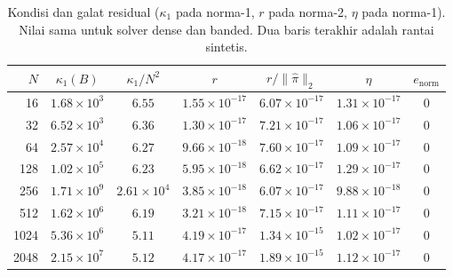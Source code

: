 \documentclass[12pt,a4paper]{article}
\numberwithin{equation}{section}
\begin{document}
\begin{table}[H]
\centering
\caption{Kondisi dan galat residual ($\kappa_1$ pada norma-1, $r$ pada norma-2, $\eta$ pada norma-1). Nilai sama untuk
solver dense dan banded. Dua baris terakhir adalah rantai sintetis.}
\label{tab:kondisi}
\small
\setlength{\tabcolsep}{5pt}
\begin{tabular}{rcccccc}
\toprule
$N$ & $\kappa_1(B)$ & $\kappa_1/N^2$ & $r$ & $r/\lVert\hat\pi\rVert_2$ & $\eta$ & $e_{\mathrm{norm}}$\\
\midrule
16 & $1.68\times10^{3}$ & $6.55$ & $1.55\times10^{-17}$ & $6.07\times10^{-17}$ & $1.31\times10^{-17}$ & $0$ \\
32 & $6.52\times10^{3}$ & $6.36$ & $1.30\times10^{-17}$ & $7.21\times10^{-17}$ & $1.06\times10^{-17}$ & $0$ \\
64 & $2.57\times10^{4}$ & $6.27$ & $9.66\times10^{-18}$ & $7.60\times10^{-17}$ & $1.09\times10^{-17}$ & $0$ \\
128 & $1.02\times10^{5}$ & $6.23$ & $5.95\times10^{-18}$ & $6.62\times10^{-17}$ & $1.29\times10^{-17}$ & $0$ \\
256 & $1.71\times10^{9}$ & $2.61\times10^{4}$ & $3.85\times10^{-18}$ & $6.07\times10^{-17}$ & $9.88\times10^{-18}$ & $0$ \\
512 & $1.62\times10^{6}$ & $6.19$ & $3.21\times10^{-18}$ & $7.15\times10^{-17}$ & $1.11\times10^{-17}$ & $0$ \\
\midrule
1024 & $5.36\times10^{6}$ & $5.11$ & $4.19\times10^{-17}$ & $1.34\times10^{-15}$ & $1.02\times10^{-17}$ & $0$ \\
2048 & $2.15\times10^{7}$ & $5.12$ & $4.17\times10^{-17}$ & $1.89\times10^{-15}$ & $1.12\times10^{-17}$ & $0$ \\
\bottomrule
\end{tabular}
\end{table}
\end{document}
